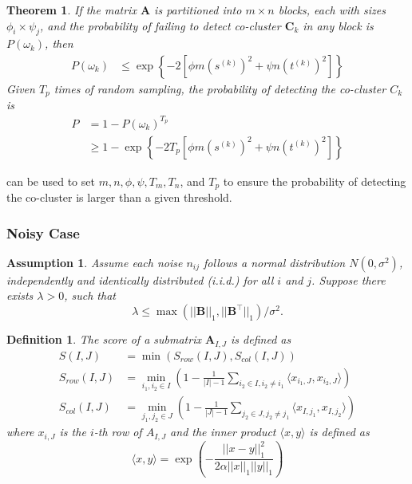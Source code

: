 \documentclass[journal]{IEEEtran}
\newtheorem{theorem}{Theorem}
\newtheorem{definition}{Definition}
\newtheorem{assumption}{Assumption}
\begin{document}
\begin{theorem}
  \label{thm:probability_co_cluster_detection}
  If the matrix $\mathbf{A}$ is partitioned into $m \times n$ blocks, each with sizes $\phi_i \times \psi_j$, and the probability of failing to detect co-cluster $\mathbf{C}_k$ in any block is $P(\omega_k)$, then
  \begin{align*}
    P(\omega_k) & \le \exp \left\{ -2 [\phi m (s^{(k)})^2 + \psi n (t^{(k)})^2] \right\}
  \end{align*}
  Given $T_p$ times of random sampling, the probability of detecting the co-cluster $C_k$ is
  \begin{align*}
    P & = 1 - P(\omega_k)^{T_p}                                                        \\
      & \ge 1 - \exp \left\{ -2 T_p [\phi m (s^{(k)})^2 + \psi n (t^{(k)})^2] \right\}
  \end{align*}

\end{theorem}

 can be used to set $m, n, \phi, \psi, T_m, T_n$, and $T_p$ to ensure the probability of detecting the co-cluster is larger than a given threshold.

\subsubsection{Noisy Case}
\label{subsubsec:noisy_case}

\begin{assumption}
  Assume each noise $n_{ij}$ follows a normal distribution $N(0, \sigma^2)$, independently and identically distributed (i.i.d.) for all $i$ and $j$. Suppose there exists $\lambda > 0$, such that
  $$\lambda \le \max(||\mathbf{B}||_1, ||\mathbf{B}^\top||_1)/\sigma^2.$$
\end{assumption}

\begin{definition}
  The score of a submatrix $\mathbf{A}_{I,J}$ is defined as
  \begin{align}
    S(I,J)       & = \min(S_{row}(I,J), S_{col}(I,J))                                                                                          \\
    S_{row}(I,J) & = \min_{i_1, i_2 \in I} \left(1- \frac{1}{|I|-1} \sum_{i_2 \in I, i_2 \neq i_1} \langle x_{i_1,J}, x_{i_2,J}\rangle \right) \\
    S_{col}(I,J) & = \min_{j_1, j_2 \in J} \left(1- \frac{1}{|J|-1} \sum_{j_2 \in J, j_2 \neq j_1} \langle x_{I,j_1}, x_{I,j_2}\rangle \right)
  \end{align}
  where $x_{i,J}$ is the $i$-th row of $A_{I,J}$ and the inner product $\langle x, y \rangle$ is defined as
  $$\langle x, y \rangle = \exp(-\frac{||x - y||_1^2}{2\alpha||x||_1||y||_1})$$
\end{definition}
\end{document}
